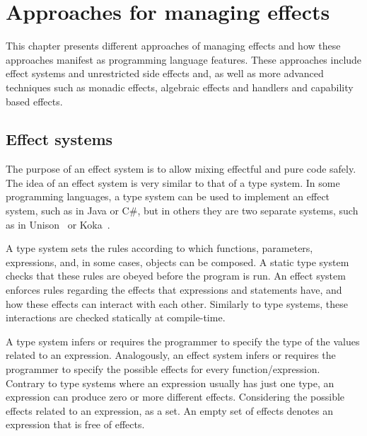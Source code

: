\chapter{Approaches for managing effects}

This chapter presents different approaches of managing effects and how these approaches manifest as programming language features. These approaches include effect systems and unrestricted side effects and, as well as more advanced techniques such as monadic effects, algebraic effects and handlers and capability based effects.


\section{Effect systems}\label{effect-systems}
The purpose of an effect system is to allow mixing effectful and pure code safely. The idea of an effect system is very similar to that of a type system. In some programming languages, a type system can be used to implement an effect system, such as in Java or C\#, but in others they are two separate systems, such as in Unison~\cite{unison-lang} or Koka~\cite{koka-lang}.

A type system sets the rules according to which functions, parameters, expressions, and, in some cases, objects can be composed. A static type system checks that these rules are obeyed before the program is run. An effect system enforces rules regarding the effects that expressions and statements have, and how these effects can interact with each other. Similarly to type systems, these interactions are checked statically at compile-time.

A type system infers or requires the programmer to specify the type of the values related to an expression. Analogously, an effect system infers or requires the programmer to specify the possible effects for every function/expression. Contrary to type systems where an expression usually has just one type, an expression can produce zero or more different effects. Considering the possible effects related to an expression, as a set. An empty set of effects denotes an expression that is free of effects.

